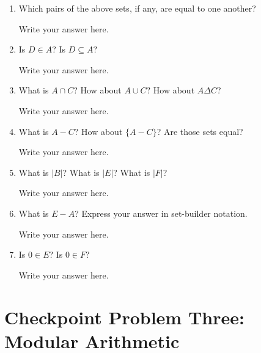 \documentclass{article}
\renewcommand{\(}{\left(}
\renewcommand{\)}{\right)}
\theoremstyle{plain}
\theoremstyle{plain}
\theoremstyle{definition}
\begin{document}
\begin{enumerate}[label*=\roman*.,ref=\roman*]

\item Which pairs of the above sets, if any, are equal to one another?

\begin{shaded}
Write your answer here.
\end{shaded}

\item Is $D \in A$? Is $D \subseteq A$?

\begin{shaded}
Write your answer here.
\end{shaded}

\item What is $A \cap C$? How about $A \cup C$? How about $A \Delta C$?

\begin{shaded}
Write your answer here.
\end{shaded}

\item What is $A - C$? How about $\{A - C\}$? Are those sets equal?

\begin{shaded}
Write your answer here.
\end{shaded}

\item What is $|B|$? What is $|E|$? What is $|F|$?

\begin{shaded}
Write your answer here.
\end{shaded}

\item What is $E - A$? Express your answer in set-builder notation.

\begin{shaded}
Write your answer here.
\end{shaded}

\item Is $0 \in E$? Is $0 \in F$?

\begin{shaded}
Write your answer here.
\end{shaded}

\end{enumerate}

\section*{Checkpoint Problem Three: Modular Arithmetic}
\end{document}
